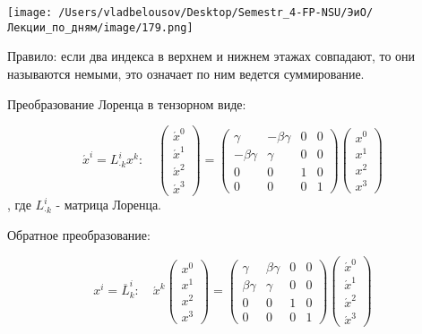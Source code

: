 \documentclass[12pt, a4paper]{report}
\begin{document}
\begin{center}
    \texttt{[image: /Users/vladbelousov/Desktop/Semestr\_4-FP-NSU/ЭиО/Лекции\_по\_дням/image/179.png]}
\end{center}

Правило: если два индекса в верхнем и нижнем этажах совпадают, то они называются немыми, это означает по ним ведется суммирование. 

Преобразование Лоренца в тензорном виде: 

\[ \acute{x}^i = L^{i } _{\cdot k}  x^k :\quad  \begin{pmatrix}
    \acute{x} ^0 \\
    \acute{x}^1\\
    \acute{x}^2\\
    \acute{x}^3
\end{pmatrix}  = \begin{pmatrix}
\gamma & - \beta \gamma  & 0 & 0\\
- \beta \gamma & \gamma & 0 & 0\\
0 & 0 & 1 & 0\\
0 & 0 & 0 & 1
\end{pmatrix} \begin{pmatrix}
x^0\\
x^1\\
x^2\\
x^3
\end{pmatrix}\] 
, где \( L_{\cdot k}  ^i  \)  - матрица Лоренца.

Обратное преобразование:

\[ x^i = \overline{L}  ^{i } _{k} :\quad   \acute{x}^k \begin{pmatrix}
    x^0\\
    x^1\\
    x^2\\
    x^3
    \end{pmatrix} = 
        \begin{pmatrix}
        \gamma & \beta \gamma  & 0 & 0\\
        \beta \gamma & \gamma & 0 & 0\\
        0 & 0 & 1 & 0\\
        0 & 0 & 0 & 1
        \end{pmatrix}
        \begin{pmatrix}
            \acute{x} ^0 \\
            \acute{x}^1\\
            \acute{x}^2\\
            \acute{x}^3
        \end{pmatrix}  \] 
\end{document}
